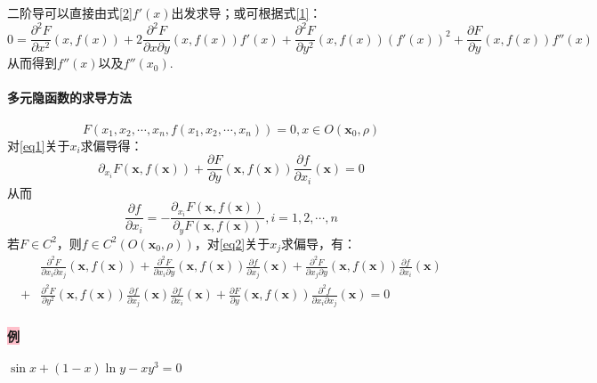 \documentclass[UTF8]{ctexart}
\begin{document}
    二阶导可以直接由式\eqref{2}$f'(x)$出发求导；或可根据式\eqref{1}：
    $$0=\frac{\partial^2 F}{\partial x^2}(x,f(x))+2\frac{\partial^2F}{\partial x\partial y}(x,f(x))f'(x)+\frac{\partial^2F}{\partial y^2}(x,f(x))(f'(x))^2+\frac{\partial F}{\partial y}(x,f(x))f''(x)$$
    从而得到$f''(x)$以及$f''(x_0)$.


    \paragraph{\colorbox{cyan!70}{多元隐函数的求导方法}}
        \begin{equation}
            F(x_1,x_2,\cdots,x_n,f(x_1,x_2,\cdots,x_n))=0,x\in O(\boldsymbol{x}_0,\rho) \label{eq1}
        \end{equation}
        对\eqref{eq1}关于$x_i$求偏导得：
        \begin{equation}
            \partial_{x_i}F(\boldsymbol{x},f(\boldsymbol{x}))+\frac{\partial F}{\partial y}(\boldsymbol{x},f(\boldsymbol{x}))\frac{\partial f}{\partial x_i}(\boldsymbol{x})=0 \label{eq2}
        \end{equation}
        从而
        \begin{equation}
            \frac{\partial f}{\partial x_i}=-\frac{\partial_{x_i}F(\boldsymbol{x},f(\boldsymbol{x}))}{\partial_yF(\boldsymbol{x},f(\boldsymbol{x}))},i=1,2,\cdots,n \label{eq3}
        \end{equation}
        若$F\in C^2$，则$f\in C^2( O(\boldsymbol{x}_0,\rho))$，对\eqref{eq2}关于$x_j$求偏导，有：
        \begin{align}
            &\frac{\partial^2F}{\partial x_i\partial x_j}(\boldsymbol{x},f(\boldsymbol{x}))+\frac{\partial^2F}{\partial x_i\partial y}(\boldsymbol{x},f(\boldsymbol{x}))\frac{\partial f}{\partial x_j}(\boldsymbol{x})+\frac{\partial^2F}{\partial x_j\partial y}(\boldsymbol{x},f(\boldsymbol{x}))\frac{\partial f}{\partial x_i}(\boldsymbol{x})\\
            +&\frac{\partial^2F}{\partial y^2}(\boldsymbol{x},f(\boldsymbol{x}))\frac{\partial f}{\partial x_j}(\boldsymbol{x})\frac{\partial f}{\partial x_i}(\boldsymbol{x})+\frac{\partial F}{\partial y}(\boldsymbol{x},f(\boldsymbol{x}))\frac{\partial^2f}{\partial x_i\partial x_j}(\boldsymbol{x})=0
        \end{align}

        \paragraph{\colorbox{pink}{例}}$\sin x+(1-x)\ln y-xy^3=0$
\end{document}
